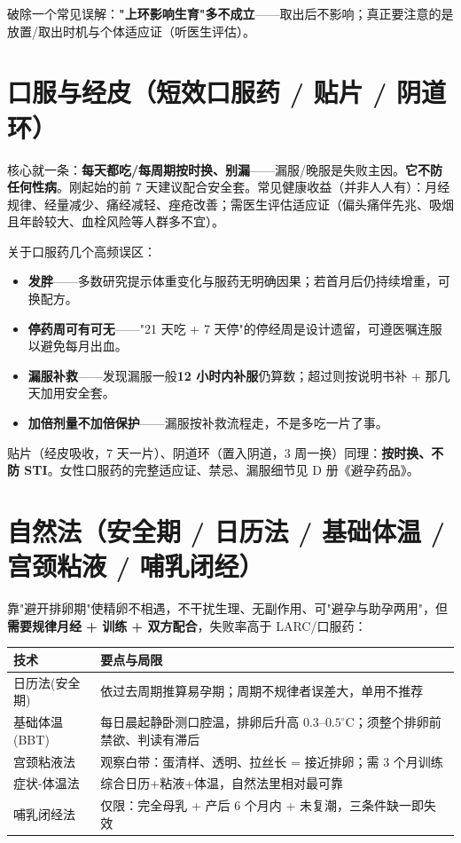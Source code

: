 \documentclass[12pt,UTF8,openany]{ctexbook}
\begin{document}
\noindent 破除一个常见误解：\textbf{"上环影响生育"多不成立}——取出后不影响；真正要注意的是放置/取出时机与个体适应证（听医生评估）。

\section{口服与经皮（短效口服药 / 贴片 / 阴道环）}

\noindent 核心就一条：\textbf{每天都吃/每周期按时换、别漏}——漏服/晚服是失败主因。\textbf{它不防任何性病}。刚起始的前 7 天建议配合安全套。常见健康收益（并非人人有）：月经规律、经量减少、痛经减轻、痤疮改善；需医生评估适应证（偏头痛伴先兆、吸烟且年龄较大、血栓风险等人群多不宜）。

\noindent 关于口服药几个高频误区：

\begin{itemize}[leftmargin=2em,itemsep=0.3em]
  \item \textbf{发胖}——多数研究提示体重变化与服药无明确因果；若首月后仍持续增重，可换配方。
  \item \textbf{停药周可有可无}——"21 天吃 + 7 天停"的停经周是设计遗留，可遵医嘱连服以避免每月出血。
  \item \textbf{漏服补救}——发现漏服一般\textbf{12 小时内补服}仍算数；超过则按说明书补 + 那几天加用安全套。
  \item \textbf{加倍剂量不加倍保护}——漏服按补救流程走，不是多吃一片了事。
\end{itemize}

\noindent 贴片（经皮吸收，7 天一片）、阴道环（置入阴道，3 周一换）同理：\textbf{按时换、不防 STI}。女性口服药的完整适应证、禁忌、漏服细节见 D 册《避孕药品》。

\section{自然法（安全期 / 日历法 / 基础体温 / 宫颈粘液 / 哺乳闭经）}

\noindent 靠"避开排卵期"使精卵不相遇，不干扰生理、无副作用、可"避孕与助孕两用"，但\textbf{需要规律月经 + 训练 + 双方配合}，失败率高于 LARC/口服药：

\begin{tabularx}{\textwidth}{lX}
\toprule
技术 & 要点与局限 \\
\midrule
日历法(安全期) & 依过去周期推算易孕期；周期不规律者误差大，单用不推荐 \\
基础体温(BBT) & 每日晨起静卧测口腔温，排卵后升高 $0.3$--$0.5^\circ$C；须整个排卵前禁欲、判读有滞后 \\
宫颈粘液法 & 观察白带：蛋清样、透明、拉丝长 = 接近排卵；需 3 个月训练 \\
症状-体温法 & 综合日历+粘液+体温，自然法里相对最可靠 \\
哺乳闭经法 & 仅限：完全母乳 + 产后 6 个月内 + 未复潮，三条件缺一即失效 \\
\bottomrule
\end{tabularx}
\end{document}
